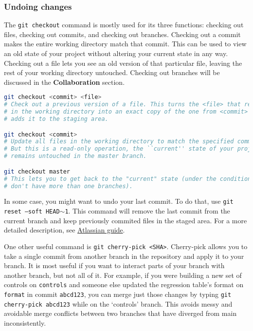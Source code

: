\subsubsection{Undoing changes}
The \texttt{git checkout} command is mostly used for its three functions:
checking out files, checking out commits, and checking out branches.
Checking out a commit makes the entire working directory match that commit.
This can be used to view an old state of your project without altering your current state in any way.
Checking out a file lets you see an old version of that particular file, leaving the rest of your working directory untouched.
Checking out branches will be discussed in the \textbf{Collaboration} section.
\\
\begin{lstlisting}[language=bash]
git checkout <commit> <file>
# Check out a previous version of a file. This turns the <file> that resides
# in the working directory into an exact copy of the one from <commit> and
# adds it to the staging area.

git checkout <commit>
# Update all files in the working directory to match the specified commit.
# But this is a read-only operation, the ``current'' state of your project
# remains untouched in the master branch.

git checkout master
# This lets you to get back to the "current" state (under the condition you
# don't have more than one branches).
\end{lstlisting}

In some case, you might want to undo your last commit.
To do that, use \texttt{git reset --soft HEAD\texttt{$\sim$}1}.
This command will remove the last commit from the current branch and keep previously commited files in the staged area.
For a more detailed description, see \href{https://www.atlassian.com/git/tutorials/undoing-changes/git-reset}{Atlassian guide}.

One other useful command is \texttt{git cherry-pick <SHA>}. 
Cherry-pick allows you to take a single commit from another branch in the repository and apply it to your branch.
It is most useful if you want to interact parts of your branch with another branch, but not all of it. 
For example, if you were building a new set of controls on \texttt{controls} and someone else updated the regression table's format on \texttt{format} in commit \texttt{abcd123}, you can merge just those changes by typing \texttt{git cherry-pick abcd123} while on the `controls' branch.
This avoids messy and avoidable merge conflicts between two branches that have diverged from main inconsistently.

